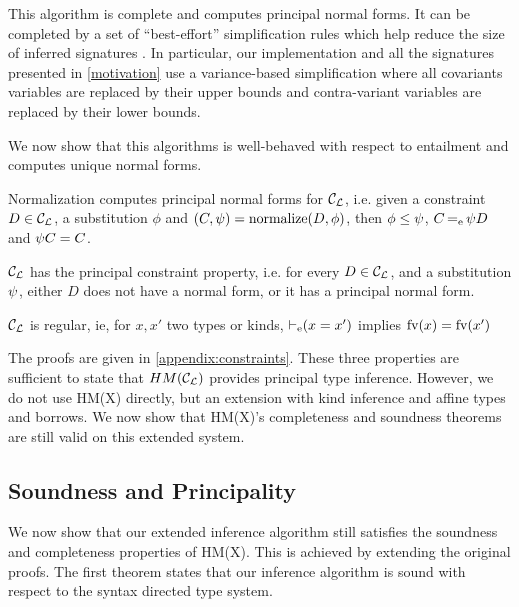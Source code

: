 
This algorithm is complete and computes principal normal forms.
It can be completed by a set of ``best-effort'' simplification
rules which help reduce the size of inferred signatures
\citep{DBLP:conf/popl/PottierS02,DBLP:conf/aplas/Simonet03}.
In particular, our implementation and all the signatures presented in
\cref{motivation} use a variance-based simplification
where all covariants variables are replaced by their upper bounds
and contra-variant variables are replaced by their lower bounds.

We now show that this algorithms is well-behaved with respect to entailment
and computes unique normal forms.

\begin{property}
  Normalization computes principal normal forms for ${\mathcal C_{\mathcal L}}$, i.e. 
  given a constraint $D\in{\mathcal C_{\mathcal L}}$, a substitution $\phi$ and
  $(C,\mathrm{\psi}) = \operatorname{normalize}(D,\phi)$,
  then $\phi\leq\mathrm{\psi}$,
  $C \operatorname{=_e} \mathrm{\psi} D$ and
  $\mathrm{\psi} C = C$.
\end{property}

\begin{property}
  ${\mathcal C_{\mathcal L}}$ has the principal constraint property, i.e.
  for every $D\in{\mathcal C_{\mathcal L}}$, and a substitution $\mathrm{\psi}$,
  either $D$ does not have a normal form, or it has
  a principal normal form.
\end{property}

\begin{property}
  ${\mathcal C_{\mathcal L}}$ is regular, ie, for $x, x'$ two types or kinds,
  $\operatorname{\vdash_e} (x = x')$ implies
  $\operatorname{fv}(x) = \operatorname{fv}(x')$
\end{property}

The proofs are given in \cref{appendix:constraints}. These three properties
are sufficient to state that $HM({\mathcal C_{\mathcal L}})$ provides principal type inference.
However, we do not use HM(X) directly, but an extension with kind inference
and affine types and borrows.
We now show that HM(X)'s completeness and soundness theorems are still valid on
this extended system.

\subsection{Soundness and Principality}

We now show that our extended inference algorithm still satisfies the soundness
and completeness properties of HM(X). This is achieved by extending
the original proofs.
%
The first theorem states that our inference algorithm is sound
with respect to the syntax directed type system.

